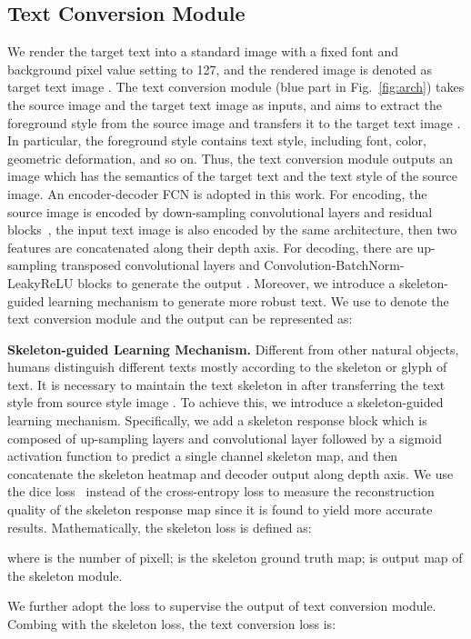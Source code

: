 \documentclass[sigconf]{acmart}
\begin{document}
\subsection{Text Conversion Module}
\label{sec:Text Conversion Module}
We render the target text into a standard image with a fixed font and background pixel value setting to 127, and the rendered image is denoted as target text image .
The text conversion module (blue part in Fig.~\ref{fig:arch}) takes the source image  and the target text image  as inputs, and aims to extract the foreground style from the source image  and transfers it to the target text image . In particular, the foreground style contains text style, including font, color, geometric deformation, and so on. Thus, the text conversion module outputs an image  which has the semantics of the target text and the text style of the source image. An encoder-decoder FCN is adopted in this work. For encoding, the source image  is encoded by  down-sampling convolutional layers and  residual blocks~\cite{he2016deep}, the input text image  is also encoded by the same architecture, then two features are concatenated along their depth axis. For decoding, there are  up-sampling transposed convolutional layers and  Convolution-BatchNorm-LeakyReLU blocks to generate the output . Moreover, we introduce a skeleton-guided learning mechanism to generate more robust text. We use  to denote the text conversion module and the output can be represented as:


\textbf{Skeleton-guided Learning Mechanism.} Different from other natural objects, humans distinguish different texts mostly according to the skeleton or glyph of text. It is necessary to maintain the text skeleton in  after transferring the text style from source style image .
To achieve this, we introduce a skeleton-guided learning mechanism. 
Specifically, we add a skeleton response block which is composed of  up-sampling layers and  convolutional layer followed by a sigmoid activation function to predict a single channel skeleton map, and then concatenate the skeleton heatmap and decoder output along depth axis. We use the dice loss~\cite{milletari2016v} instead of the cross-entropy loss to measure the reconstruction quality of the skeleton response map since it is found to yield more accurate results. Mathematically, the skeleton loss is defined as: 

where  is the number of pixell;  is the skeleton ground truth map;  is output map of the skeleton module. 


We further adopt the  loss to supervise the output of text conversion module. Combing with the skeleton loss, the text conversion loss is:
\end{document}
